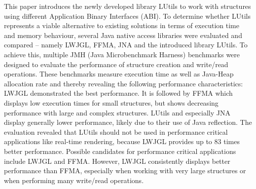 This paper introduces the newly developed library LUtils to work with structures using different Application Binary Interfaces (ABI).
To determine whether LUtils represents a viable alternative to existing solutions in terms of execution time and memory behaviour,
several Java native access libraries were evaluated and compared – namely LWJGL, FFMA, JNA and the introduced library LUtils.
To achieve this, multiple JMH (Java Microbenchmark Harness) benchmarks were designed to evaluate the performance of structure
creation and write/read operations.
These benchmarks measure execution time as well as Java-Heap allocation rate and thereby revealing the following performance characteristics:
LWJGL demonstrated the best performance.
It is followed by FFMA which displays low execution times for small structures,
but shows decreasing performance with large and complex structures.
LUtils and especially JNA display generally lower performance, likely due to their use of Java reflection.
The evaluation revealed that LUtils should not be used in performance critical applications like real-time rendering,
because LWJGL provides up to 83 times better performance.
Possible candidates for performance critical applications include LWJGL and FFMA. However, LWJGL consistently displays
better performance than FFMA, especially when working with very large structures or when performing many write/read
operations.